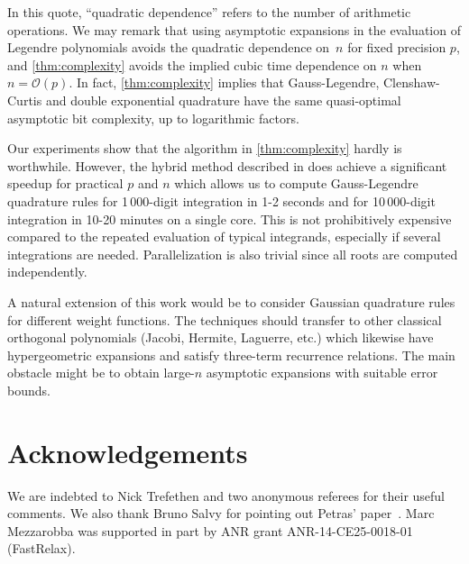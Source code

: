 \documentclass[nohypdvips,review]{siamart0216}
\newcommand{\OO}{\mathcal{O}}
\begin{document}
In this quote, ``quadratic dependence'' refers to the number of arithmetic operations.
We may remark that using asymptotic expansions in the
evaluation of Legendre polynomials avoids the quadratic
dependence on~$n$ for fixed precision $p$, and \cref{thm:complexity}
avoids the implied cubic time dependence on $n$ when $n = \OO(p)$.
In fact, \cref{thm:complexity} implies that
Gauss-Legendre, Clenshaw-Curtis and double exponential
quadrature have the same quasi-optimal asymptotic bit complexity,
up to logarithmic factors.

Our experiments show that the algorithm in \cref{thm:complexity}
hardly is worthwhile. However, the hybrid method described in
 does achieve a
significant speedup for practical $p$ and $n$
which allows us to compute Gauss-Legendre quadrature rules for
1\,000-digit integration in 1-2 seconds and for 10\,000-digit integration in 10-20 minutes
on a single core. This is not prohibitively
expensive compared to the repeated evaluation
of typical integrands, especially if several integrations are needed.
Parallelization is also trivial since all roots
are computed independently.

A natural extension of this work would be to
consider Gaussian quadrature rules for different
weight functions.
The techniques should transfer to other
classical orthogonal polynomials (Jacobi, Hermite, Laguerre, etc.)
which likewise have hypergeometric expansions
and satisfy three-term recurrence relations.
The main obstacle might be
to obtain large-$n$ asymptotic expansions with suitable error bounds.

\section*{Acknowledgements}

We are indebted to Nick Trefethen and two anonymous referees for their
useful comments. We also thank Bruno Salvy for pointing out Petras'
paper~\cite{petras1999computation}.
Marc Mezzarobba was supported in part by ANR grant ANR-14-CE25-0018-01
(Fast\-Relax).



\end{document}

